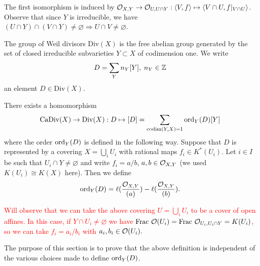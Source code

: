 The first isomorphism is induced by 
$\mathcal{O}_{X,Y}\to \mathcal{O}_{U,U\cap Y}:\langle V,f\rangle\mapsto \langle V\cap U, f|_{V\cap U}\rangle$. Observe that 
since $Y$ is irreducible, we have $(U\cap Y)\cap (V\cap Y)\neq\varnothing\Rightarrow U\cap V\neq\varnothing$.
\begin{dang}
    \begin{definition}
        The group of Weil divisors $\text{Div}(X)$ is the free abelian group generated by the set of closed
        irreducible subvarieties $Y\subset X$ of codimension one. We write 
        \begin{equation}
            D = \sum_Y n_Y[Y],\; n_Y\in\mathbb{Z}
        \end{equation}
        an element $D\in\text{Div}(X)$.
    \end{definition}
\end{dang}

\begin{dang}
    \begin{proposition}\label{proposition: order is well defined}
        There exists a homomorphism 
        \begin{equation}
            \text{CaDiv}(X)\to \text{Div}(X):D\mapsto [D]=\sum_{\text{codim}(Y,X)=1}\text{ord}_Y(D)[Y]
        \end{equation}
        where the order $\text{ord}_Y(D)$ is defined in the following way. Suppose that 
        $D$ is represented by a covering $X=\bigcup_i U_i$ with rational maps $f_i\in K^*(U_i)$. 
        Let $i\in I$ be such that $U_i\cap Y\neq\varnothing$ and write $f_i=a/b$, $a,b\in\mathcal{O}_{X,Y}$
        (we used $K(U_i)\cong K(X)$ here). Then we define 
        \begin{equation}
            \text{ord}_Y(D)=\ell(\frac{\mathcal{O}_{X,Y}}{(a)}) -\ell(\frac{\mathcal{O}_{X,Y}}{(b)}).
        \end{equation}
    \end{proposition}
\end{dang}

\begin{remark}
    \textcolor{red}{Will observe that we can take the above covering $U=\bigcup_i U_i$ to be a cover of open affines. In 
    this case, if $Y\cap U_i\neq\varnothing$ we have $\text{Frac }\mathcal{O}(U_i)=\text{Frac }\mathcal{O}_{U_i,U_i\cap Y}=K(U_i)$, 
    so we can take $f_i = a_i/b_i$ with $a_i,b_i\in \mathcal{O}(U_i).$}
\end{remark}

The purpose of this section is to prove that the above definition is independent of the various choices made 
to define $\text{ord}_Y(D)$.

